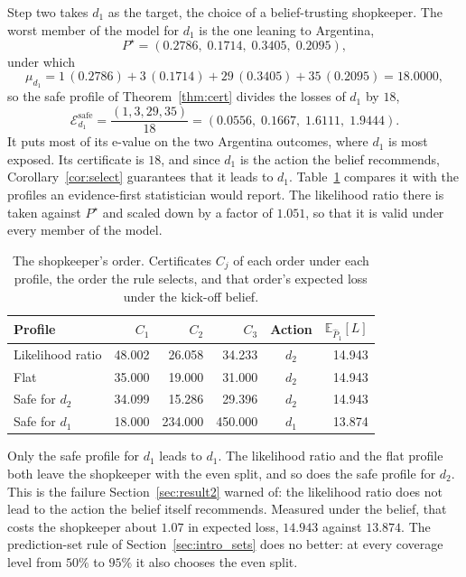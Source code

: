 Step two takes $d_1$ as the target, the choice of a belief-trusting
shopkeeper. The worst member of the model for $d_1$ is the one leaning to
Argentina,
\[
  P^\star=(0.2786,\;0.1714,\;0.3405,\;0.2095),
\]
under which
\[
  \mu_{d_1}=1\,(0.2786)+3\,(0.1714)+29\,(0.3405)+35\,(0.2095)=18.0000,
\]
so the safe profile of Theorem~\ref{thm:cert} divides the losses of $d_1$ by
$18$,
\begin{equation}
  \mathcal E^{\mathrm{safe}}_{d_1}
  =\frac{(1,3,29,35)}{18}
  =(0.0556,\;0.1667,\;1.6111,\;1.9444).
  \label{eq:market_safe}
\end{equation}
It puts most of its e-value on the two Argentina outcomes, where $d_1$ is most
exposed. Its certificate is $18$, and since $d_1$ is the action the belief
recommends, Corollary~\ref{cor:select} guarantees that it leads to $d_1$.
Table~\ref{tab:market} compares it with the profiles an evidence-first
statistician would report. The likelihood ratio there is taken against
$P^\star$ and scaled down by a factor of $1.051$, so that it is valid under
every member of the model.

\begin{table}[htbp]
\centering
\caption{The shopkeeper's order. Certificates $C_j$ of each order under each profile, the order the rule selects, and that order's expected loss under the kick-off belief.}\label{tab:market}
\begin{tabular}{@{}l r r r c r@{}}\toprule
Profile & $C_1$ & $C_2$ & $C_3$ & Action & $\mathbb E_{\widehat P_1}[L]$ \\\midrule
Likelihood ratio          & 48.002 & 26.058 & 34.233 & $d_2$ & 14.943 \\
Flat                      & 35.000 & 19.000 & 31.000 & $d_2$ & 14.943 \\
Safe for $d_2$            & 34.099 & 15.286 & 29.396 & $d_2$ & 14.943 \\
Safe for $d_1$            & 18.000 & 234.000 & 450.000 & $d_1$ & 13.874 \\\bottomrule
\end{tabular}
\end{table}

Only the safe profile for $d_1$ leads to $d_1$. The likelihood ratio and the
flat profile both leave the shopkeeper with the even split, and so does the
safe profile for $d_2$. This is the failure Section~\ref{sec:result2} warned
of: the likelihood ratio does not lead to the action the belief itself
recommends. Measured under the belief, that costs the shopkeeper about $1.07$
in expected loss, $14.943$ against $13.874$. The prediction-set rule of
Section~\ref{sec:intro_sets} does no better: at every coverage level from
$50\%$ to $95\%$ it also chooses the even split.

